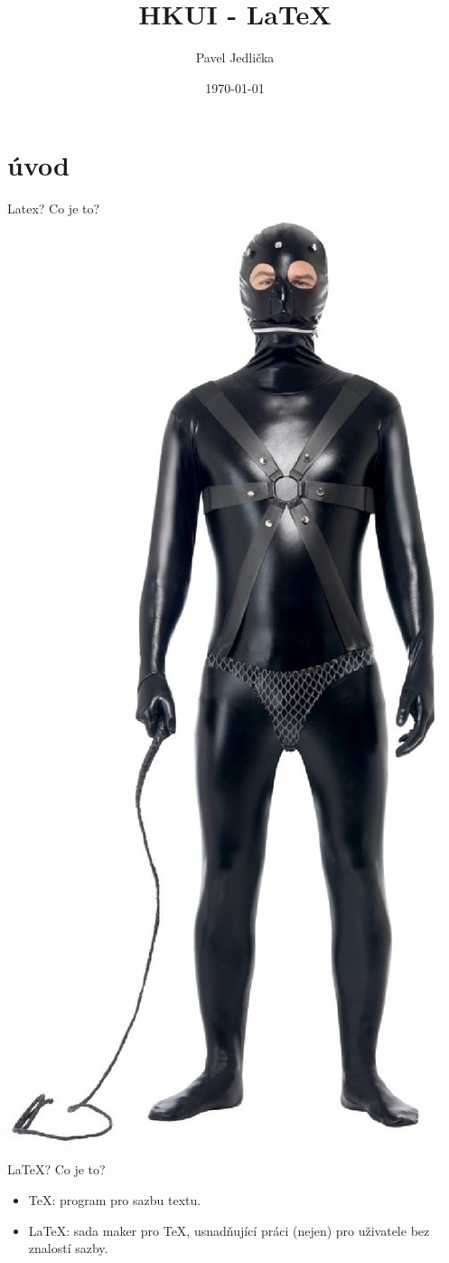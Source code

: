 \documentclass{beamer}
\title[HKUI]{HKUI - \LaTeX}
\author{Pavel Jedli\v{c}ka}
\institute{Západočeská univerzita v Plzni}
\date{\today}
\begin{document}

\begin{frame}
  \titlepage
  
\end{frame}


\section{úvod}
\begin{frame}{Latex? Co je to?}
\centering
\includegraphics[width=.3\textwidth]{pic/latex_fun.jpg}
\caption{Tohle je latex. \footnote{Zdroj: Smiffy's Men's Gimp Costume Bodysuit with Straps and Chainmail Pants @ Amazon (from $\$$ 26.49)}}
\end{frame}


\begin{frame}{\LaTeX? Co je to?}
\begin{itemize}
    \item \TeX: program pro sazbu textu. 
    \vspace{1cm}
    \item \LaTeX: sada maker pro \TeX, usnadňující práci (nejen) pro uživatele bez znalostí sazby. 
\end{itemize}
\end{frame}
\end{document}
